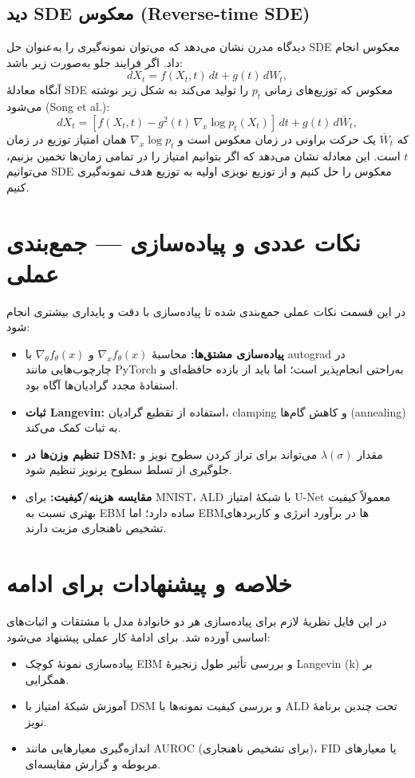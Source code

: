 \subsection{دید SDE معکوس (Reverse-time SDE)}
دیدگاه مدرن نشان می‌دهد که می‌توان نمونه‌گیری را به‌عنوان حل SDE معکوس انجام داد. اگر فرایند جلو به‌صورت زیر باشد:
\begin{equation}
dX_t = f(X_t,t)\,dt + g(t)\,dW_t,
\end{equation}
آنگاه معادلهٔ SDE معکوس که توزیع‌های زمانی \(p_t\) را تولید می‌کند به شکل زیر نوشته می‌شود (Song et al.):
\begin{equation}\label{eq:reverse_sde}
dX_t = [f(X_t,t) - g^2(t)\,\nabla_x \log p_t(X_t)]\,dt + g(t)\,d\bar W_t,
\end{equation}
که \(\bar W_t\) یک حرکت براونی در زمان معکوس است و \(\nabla_x \log p_t\) همان امتیاز توزیع در زمان \(t\) است. این معادله نشان می‌دهد که اگر بتوانیم امتیاز را در تمامی زمان‌ها تخمین بزنیم، می‌توانیم SDE معکوس را حل کنیم و از توزیع نویزی اولیه به توزیع هدف نمونه‌گیری کنیم.

\section{نکات عددی و پیاده‌سازی — جمع‌بندی عملی}
در این قسمت نکات عملی جمع‌بندی شده تا پیاده‌سازی با دقت و پایداری بیشتری انجام شود:
\begin{itemize}
    \item \textbf{پیاده‌سازی مشتق‌ها:} محاسبهٔ \(\nabla_x f_{\theta}(x)\) و \(\nabla_{\theta} f_{\theta}(x)\) با autograd در چارچوب‌هایی مانند PyTorch به‌راحتی انجام‌پذیر است؛ اما باید از بازده حافظه‌ای و استفادهٔ مجدد گرادیان‌ها آگاه بود.
    \item \textbf{ثبات Langevin:} استفاده از تقطیع گرادیان، clamping و کاهش گام‌ها (annealing) به ثبات کمک می‌کند.
    \item \textbf{تنظیم وزن‌ها در DSM:} مقدار \(\lambda(\sigma)\) می‌تواند برای تراز کردن سطوح نویز و جلوگیری از تسلط سطوح پرنویز تنظیم شود.
    \item \textbf{مقایسه هزینه/کیفیت:} برای MNIST، ALD با شبکهٔ امتیاز U-Net معمولاً کیفیت بهتری نسبت به EBM ساده دارد؛ اما EBMها در برآورد انرژی و کاربردهای تشخیص ناهنجاری مزیت دارند.
\end{itemize}

\section{خلاصه و پیشنهادات برای ادامه}
در این فایل نظریهٔ لازم برای پیاده‌سازی هر دو خانوادهٔ مدل با مشتقات و اثبات‌های اساسی آورده شد. برای ادامهٔ کار عملی پیشنهاد می‌شود:
\begin{itemize}
    \item پیاده‌سازی نمونهٔ کوچک EBM و بررسی تأثیر طول زنجیرهٔ Langevin (k) بر همگرایی.
    \item آموزش شبکهٔ امتیاز با DSM و بررسی کیفیت نمونه‌ها با ALD تحت چندین برنامهٔ نویز.
    \item اندازه‌گیری معیارهایی مانند AUROC (برای تشخیص ناهنجاری)، FID یا معیارهای مربوطه و گزارش مقایسه‌ای.
\end{itemize}

